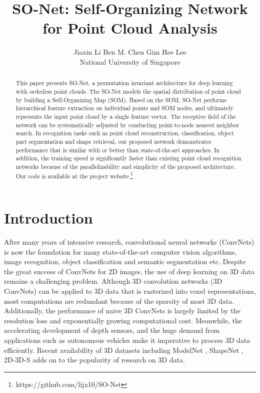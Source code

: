 \documentclass[10pt,twocolumn,letterpaper]{article}
\begin{document}
\title{SO-Net: Self-Organizing Network for Point Cloud Analysis}

\author{Jiaxin Li \qquad Ben M. Chen \qquad Gim Hee Lee \\
National University of Singapore
}

\maketitle




\begin{abstract}
This paper presents SO-Net, a permutation invariant architecture for deep learning with orderless point clouds. The SO-Net models the spatial distribution of point cloud by building a Self-Organizing Map (SOM). Based on the SOM, SO-Net performs hierarchical feature extraction on individual points and SOM nodes, and ultimately represents the input point cloud by a single feature vector. The receptive field of the network can be systematically adjusted by conducting point-to-node  nearest neighbor search. In recognition tasks such as point cloud reconstruction, classification, object part segmentation and shape retrieval, our proposed network demonstrates performance that is similar with or better than state-of-the-art approaches. In addition, the training speed is significantly faster than existing point cloud recognition networks because of the parallelizability and simplicity of the proposed architecture. Our code is available at the project website.\footnote{https://github.com/lijx10/SO-Net}

\end{abstract}
\section{Introduction} \label{sec_intro}
After many years of intensive research, convolutional neural networks (ConvNets) is now the foundation for many state-of-the-art computer vision algorithms, \eg image recognition, object classification and semantic segmentation etc. Despite the great success of ConvNets for 2D images, the use of deep learning on 3D data remains a challenging problem. Although 3D convolution networks (3D ConvNets) can be applied to 3D data that is rasterized into voxel representations, most computations are redundant because of the sparsity of most 3D data. Additionally, the performance of naive 3D ConvNets is largely limited by the resolution loss and exponentially growing computational cost. Meanwhile, the accelerating development of depth sensors, and the huge demand from applications such as autonomous vehicles make it imperative to process 3D data efficiently. Recent availability of 3D datasets including ModelNet \cite{wu20153d}, ShapeNet \cite{chang2015shapenet}, 2D-3D-S \cite{2017arXiv170201105A} adds on to the popularity of research on 3D data. 
\end{document}
